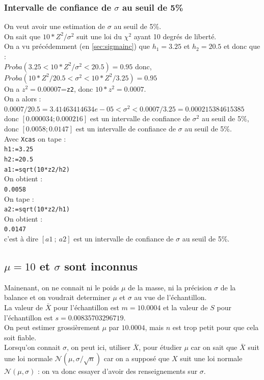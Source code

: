 \documentclass[a4paper,11pt]{book}
\begin{document}
\subsubsection{Intervalle de confiance de $\sigma$ au  seuil de 5\%}
On veut avoir une estimation de $\sigma$ au  seuil de 5\%.\\
On sait que $10*Z^2/\sigma^2$ suit une loi du $\chi^2$ ayant 10 degr\'es de libert\'e.\\
On a vu pr\'ec\'edemment (en \ref{sec:sigmainc}) que $h_1=3.25$ et $h_2=20.5$ 
et donc que :\\
$Proba(3.25<10*Z^2/\sigma^2<20.5)=0.95$ donc,\\
$Proba(10*Z^2/20.5<\sigma^2<10*Z^2/3.25)=0.95$\\
On a  $z^2=0.00007$={\tt z2}, donc $10*z^2=0.0007$.\\
On a alors :\\ 
$0.0007/20.5=3.41463414634e-05<\sigma^2<0.0007/3.25=0.000215384615385$\\
donc $[0.000034;0.000216]$ est un intervalle de confiance de 
$\sigma^2$ au  seuil de 5\%, \\
donc $[0.0058;0.0147]$ est un intervalle de confiance de 
$\sigma$ au  seuil de 5\%.\\
Avec {\tt Xcas} on tape :\\
{\tt h1:=3.25 }\\
{\tt h2:=20.5}\\
{\tt a1:=sqrt(10*z2/h2)}\\
On obtient :\\
{\tt 0.0058}\\
 On tape :\\
{\tt a2:=sqrt(10*z2/h1)}\\
On obtient :\\
{\tt 0.0147}\\
c'est \`a dire $[a1\ ;\ a2]$ est un intervalle de confiance de 
$\sigma$ au  seuil de 5\%.
\subsection{$\mu=10$ et $\sigma$ sont inconnus}
Mainenant, on ne connait ni le poids $\mu$ de la masse, ni la pr\'ecision 
$\sigma$ de la balance  et on voudrait determiner $\mu$ et $\sigma$ 
au vue de l'\'echantillon.\\
La valeur de $\bar X$ pour l'\'echantillon est $m=10.0004$ et la valeur de 
$S$ pour l'\'echantillon est $s=0.00835703296719$.\\
On peut estimer grossi\`erement $\mu$ par $10.0004$, mais $n$ est trop petit 
pour que cela soit fiable.\\
Lorsqu'on connait $\sigma$, on peut ici, utiliser $\bar X$, pour \'etudier 
$\mu$ car on 
sait que  $\bar X$ suit une loi normale $\mathcal N(\mu,\sigma/\sqrt n)$ 
car on a suppos\'e que $X$ suit une loi normale $\mathcal N(\mu,\sigma)$ : 
on va donc essayer d'avoir des renseignements sur $\sigma$.
\end{document}
